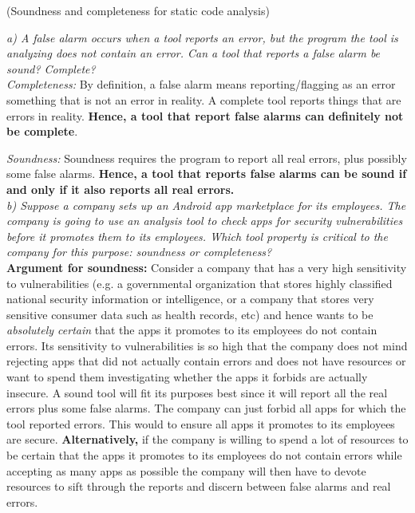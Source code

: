 \begin{prob}  (Soundness and completeness for static code analysis)
\end{prob}

\noindent \textit{a) A false alarm occurs when a tool reports an error, but the program the tool is analyzing does not contain an error. Can a tool that reports a false alarm be sound? Complete?}\\

\noindent \textit{Completeness: }By definition, a false alarm means reporting/flagging as an error something that is not an error in reality. A complete tool  reports things that are errors in reality. \textbf{Hence, a tool that report false alarms can definitely not be complete}.

\noindent\textit{Soundness: } Soundness requires the program to report all real errors, plus possibly some false alarms. \textbf{Hence, a tool that reports false alarms can be sound if and only if it also reports all real errors.}\\

\noindent \textit{b) Suppose a company sets up an Android app marketplace for its employees. The company is going to use an analysis tool to check apps for security vulnerabilities before it promotes them to its employees. Which tool property is critical to the company for this purpose: soundness or completeness?}\\

\noindent \textbf{Argument for soundness: } Consider a company that has a very high sensitivity to vulnerabilities (e.g. a governmental organization that stores highly classified national security information or intelligence, or a company that stores very sensitive consumer data such as health records, etc) and hence wants to be \textit{absolutely certain} that the apps it promotes to its employees do not contain errors. Its sensitivity to vulnerabilities is so high that the company does not mind rejecting apps that did not actually contain errors and does not have resources or want to spend them investigating whether the apps it forbids are actually insecure. A sound tool will fit its purposes best since it will report all the real errors plus some false alarms. The company can just forbid all apps for which the tool reported errors. This would to ensure all apps it promotes to its employees are secure. \textbf{Alternatively,} if the company is willing to spend a lot of resources to be certain that the apps it promotes to its employees do not contain errors while accepting as many apps as possible the company will then have to devote resources to sift through the reports and discern between false alarms and real errors.\\

